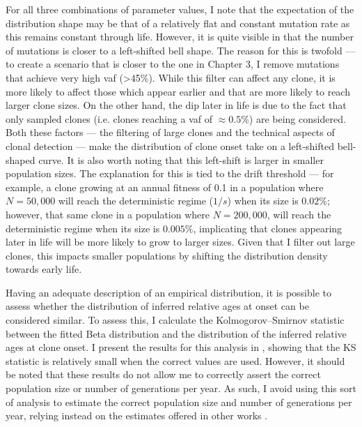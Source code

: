 For all three combinations of parameter values, I note that the expectation of the distribution shape may be that of a relatively flat and constant mutation rate as this remains constant through life. However, it is quite visible in  that the number of mutations is closer to a left-shifted bell shape. The reason for this is twofold --- to create a scenario that is closer to the one in Chapter 3, I remove mutations that achieve very high \ac{vaf} (>45\%). While this filter can affect any clone, it is more likely to affect those which appear earlier and that are more likely to reach larger clone sizes. On the other hand, the dip later in life is due to the fact that only sampled clones (i.e. clones reaching a \ac{vaf} of $\approx 0.5\%$) are being considered. Both these factors --- the filtering of large clones and the technical aspects of clonal detection --- make the distribution of clone onset take on a left-shifted bell-shaped curve. It is also worth noting that this left-shift is larger in smaller population sizes. The explanation for this is tied to the drift threshold --- for example, a clone growing at an annual fitness of 0.1 in a population where $N=50,000$ will reach the deterministic regime ($1/s$) when its size is $0.02\%$; however, that same clone in a population where $N=200,000$, will reach the deterministic regime when its size is $0.005\%$, implicating that clones appearing later in life will be more likely to grow to larger sizes. Given that I filter out large clones, this impacts smaller populations by shifting the distribution density towards early life. 

Having an adequate description of an empirical distribution, it is possible to assess whether the distribution of inferred relative ages at onset can be considered similar. To assess this, I calculate the Kolmogorov–Smirnov statistic between the fitted Beta distribution and the distribution of the inferred relative ages at clone onset. I present the results for this analysis in , showing that the KS statistic is relatively small when the correct values are used. However, it should be noted that these results do not allow me to correctly assert the correct population size or number of generations per year. As such, I avoid using this sort of analysis to estimate the correct population size and number of generations per year, relying instead on the estimates offered in other works \cite{Lee-Six2018-lp,Mitchell2021-zl}.

\begin{figure}[!ht]
	\label{fig:heatmap-ks-d}
\end{figure}

